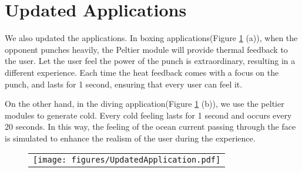 \section{Updated Applications}

We also updated the applications. In boxing applications(Figure \ref{fig:UpdatedApplication} (a)), when the opponent punches heavily, the Peltier module will provide thermal 
feedback to the user. Let the user feel the power of the punch is extraordinary, resulting in a different experience. Each time the heat feedback comes with a focus on the punch, and lasts for 1 second, ensuring that every user can feel it. 

On the other hand, in the diving application(Figure \ref{fig:UpdatedApplication} (b)), we use the peltier modules to generate cold. Every cold feeling lasts for 1 second and occurs every 20 seconds. In this way, the feeling of the ocean current passing through the face is simulated to enhance the realism of the user during the experience.

\begin{figure}[b!]
    \begin{center}
        \begin{tabular}{@{\hspace{0.1cm}}c}
           \texttt{[image: figures/UpdatedApplication.pdf]}
        \end{tabular}
        \label{fig:UpdatedApplication}
    \end{center}
\end{figure}
